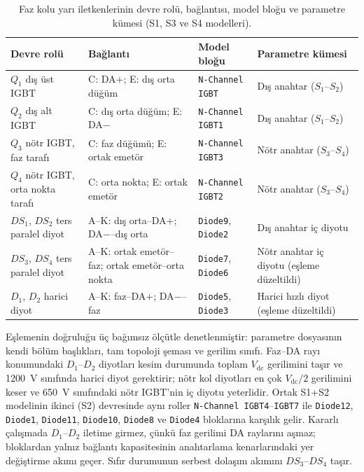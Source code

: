 \begin{table}[htbp]
  \centering
  \caption{Faz kolu yarı iletkenlerinin devre rolü, bağlantısı, model bloğu ve parametre kümesi (S1, S3 ve S4 modelleri).}
  \label{tab:yariiletken-esleme}
  \footnotesize
  \begin{tabularx}{\textwidth}{>{\raggedright\arraybackslash}p{} >{\raggedright\arraybackslash}p{} >{\raggedright\arraybackslash}p{} >{\raggedright\arraybackslash}X}
    \toprule
    Devre rolü & Bağlantı & Model bloğu & Parametre kümesi \\
    \midrule
    $Q_1$ dış üst IGBT & C: DA$+$; E: dış orta düğüm & \texttt{N-Channel IGBT} & Dış anahtar ($S_1$--$S_2$) \\
    $Q_2$ dış alt IGBT & C: dış orta düğüm; E: DA$-$ & \texttt{N-Channel IGBT1} & Dış anahtar ($S_1$--$S_2$) \\
    $Q_3$ nötr IGBT, faz tarafı & C: faz düğümü; E: ortak emetör & \texttt{N-Channel IGBT3} & Nötr anahtar ($S_3$--$S_4$) \\
    $Q_4$ nötr IGBT, orta nokta tarafı & C: orta nokta; E: ortak emetör & \texttt{N-Channel IGBT2} & Nötr anahtar ($S_3$--$S_4$) \\
    $DS_1$, $DS_2$ ters paralel diyot & A--K: dış orta--DA$+$; DA$-$--dış orta & \texttt{Diode9}, \texttt{Diode2} & Dış anahtar iç diyotu \\
    $DS_3$, $DS_4$ ters paralel diyot & A--K: ortak emetör--faz; ortak emetör--orta nokta & \texttt{Diode7}, \texttt{Diode6} & Nötr anahtar iç diyotu (eşleme düzeltildi) \\
    $D_1$, $D_2$ harici diyot & A--K: faz--DA$+$; DA$-$--faz & \texttt{Diode5}, \texttt{Diode3} & Harici hızlı diyot (eşleme düzeltildi) \\
    \bottomrule
  \end{tabularx}
\end{table}

Eşlemenin doğruluğu üç bağımsız ölçütle denetlenmiştir: parametre dosyasının kendi bölüm başlıkları, tam topoloji şeması ve gerilim sınıfı. Faz--DA rayı konumundaki $D_1$--$D_2$ diyotları kesim durumunda toplam $V_{\mathrm{dc}}$ gerilimini taşır ve \SI{1200}{\volt} sınıfında harici diyot gerektirir; nötr kol diyotları en çok $V_{\mathrm{dc}}/2$ gerilimini keser ve \SI{650}{\volt} sınıfındaki nötr IGBT'nin iç diyotu yeterlidir. Ortak S1+S2 modelinin ikinci (S2) devresinde aynı roller \texttt{N-Channel IGBT4}--\texttt{IGBT7} ile \texttt{Diode12}, \texttt{Diode1}, \texttt{Diode11}, \texttt{Diode10}, \texttt{Diode8} ve \texttt{Diode4} bloklarına karşılık gelir. Kararlı çalışmada $D_1$--$D_2$ iletime girmez, çünkü faz gerilimi DA raylarını aşmaz; bloklardan yalnız bağlantı kapasitesinin anahtarlama kenarlarındaki yer değiştirme akımı geçer. Sıfır durumunun serbest dolaşım akımını $DS_3$--$DS_4$ taşır.

